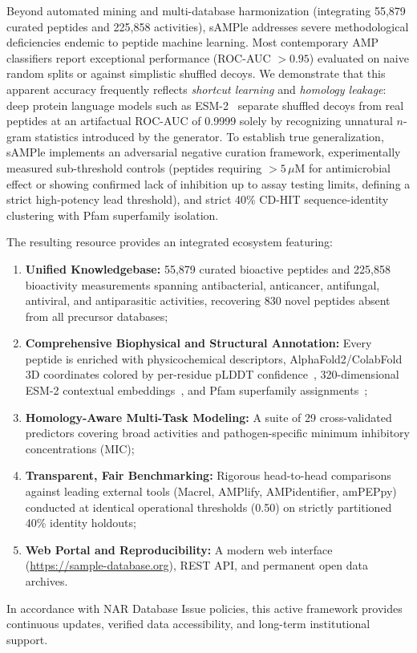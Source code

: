\documentclass[unnumsec,webpdf,contemporary,large]{oup-authoring-template}%
\begin{document}
Beyond automated mining and multi-database harmonization (integrating 55,879 curated peptides and 225,858 activities), sAMPle addresses severe methodological deficiencies endemic to peptide machine learning. Most contemporary AMP classifiers report exceptional performance (ROC-AUC $>0.95$) evaluated on naive random splits or against simplistic shuffled decoys. We demonstrate that this apparent accuracy frequently reflects \emph{shortcut learning} and \emph{homology leakage}: deep protein language models such as ESM-2~\cite{lin2023evolutionary} separate shuffled decoys from real peptides at an artifactual ROC-AUC of 0.9999 solely by recognizing unnatural $n$-gram statistics introduced by the generator. To establish true generalization, sAMPle implements an adversarial negative curation framework, experimentally measured sub-threshold controls (peptides requiring $>5\,\mu\text{M}$ for antimicrobial effect or showing confirmed lack of inhibition up to assay testing limits, defining a strict high-potency lead threshold), and strict 40\% CD-HIT sequence-identity clustering with Pfam superfamily isolation. 

The resulting resource provides an integrated ecosystem featuring:
\begin{enumerate}
    \item \textbf{Unified Knowledgebase:} 55,879 curated bioactive peptides and 225,858 bioactivity measurements spanning antibacterial, anticancer, antifungal, antiviral, and antiparasitic activities, recovering 830 novel peptides absent from all precursor databases;
    \item \textbf{Comprehensive Biophysical and Structural Annotation:} Every peptide is enriched with physicochemical descriptors, AlphaFold2/ColabFold 3D coordinates colored by per-residue pLDDT confidence~\cite{jumper2021highly,mirdita2022colabfold}, 320-dimensional ESM-2 contextual embeddings~\cite{lin2023evolutionary}, and Pfam superfamily assignments~\cite{mistry2021pfam};
    \item \textbf{Homology-Aware Multi-Task Modeling:} A suite of 29 cross-validated predictors covering broad activities and pathogen-specific minimum inhibitory concentrations (MIC);
    \item \textbf{Transparent, Fair Benchmarking:} Rigorous head-to-head comparisons against leading external tools (Macrel, AMPlify, AMPidentifier, amPEPpy) conducted at identical operational thresholds (0.50) on strictly partitioned 40\% identity holdouts;
    \item \textbf{Web Portal and Reproducibility:} A modern web interface (\url{https://sample-database.org}), REST API, and permanent open data archives.
\end{enumerate}
In accordance with NAR Database Issue policies, this active framework provides continuous updates, verified data accessibility, and long-term institutional support.
\end{document}
